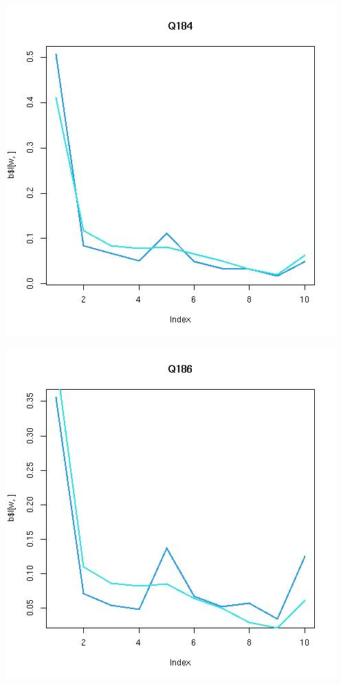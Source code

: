 \documentclass{amsart}
\begin{document}
\includegraphics[scale=0.6]{fitQ184.jpeg}

\includegraphics[scale=0.6]{fitQ186.jpeg}
\end{document}
